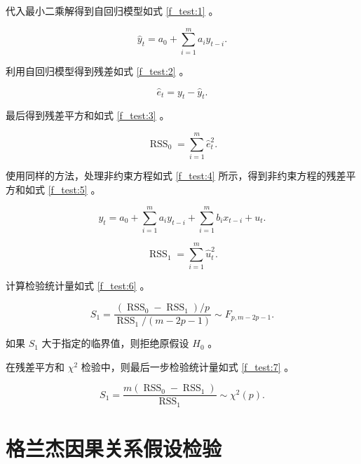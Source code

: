 代入最小二乘解得到自回归模型如式 \ref{f_test:1} 。

\begin{equation}
  \label{f_test:1}
  \hat{y}_t=a_{0}+\sum_{i=1}^{m}a_{i}y_{t-i}.
\end{equation}

利用自回归模型得到残差如式 \ref{f_test:2} 。

\begin{equation}
  \label{f_test:2}
  \hat{e}_t=y_{t}-\hat{y}_t.
\end{equation}

最后得到残差平方和如式 \ref{f_test:3} 。

\begin{equation}
  \label{f_test:3}
  \operatorname{RSS}_{0}=\sum_{i=1}^{m}\hat{e}_{t}^2.
\end{equation}

使用同样的方法，处理非约束方程如式 \ref{f_test:4} 所示，得到非约束方程的残差平方和如式 \ref{f_test:5} 。

\begin{equation}
  \label{f_test:4}
  y_{t}=a_{0}+\sum_{i=1}^{m}a_{i}y_{t-i}+\sum_{i=1}^{m}b_{i}x_{t-i}+u_{t}.
\end{equation}

\begin{equation}
  \label{f_test:5}
  \operatorname{RSS}_{1}=\sum_{i=1}^{m}\hat{u}_{t}^2.
\end{equation}

计算检验统计量如式 \ref{f_test:6} 。

\begin{equation}
  \label{f_test:6}
  S_{1}=\frac{(\operatorname{RSS}_{0}-\operatorname{RSS}_{1})/p}{\operatorname{RSS}_{1}/(m-2p-1)}\sim F_{p,m-2p-1}.
\end{equation}

如果 $S_{1}$ 大于指定的临界值，则拒绝原假设 $H_{0}$ 。

在残差平方和 $\chi^{2}$ 检验中，则最后一步检验统计量如式 \ref{f_test:7} 。

\begin{equation}
  \label{f_test:7}
  S_{1}=\frac{m(\operatorname{RSS}_{0}-\operatorname{RSS}_{1})}{\operatorname{RSS}_{1}}\sim \chi^{2}(p).
\end{equation}

\section{格兰杰因果关系假设检验}

